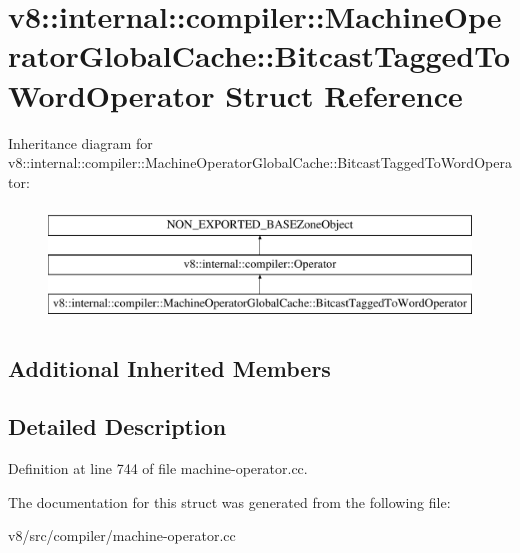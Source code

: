 \hypertarget{structv8_1_1internal_1_1compiler_1_1MachineOperatorGlobalCache_1_1BitcastTaggedToWordOperator}{}\section{v8\+:\+:internal\+:\+:compiler\+:\+:Machine\+Operator\+Global\+Cache\+:\+:Bitcast\+Tagged\+To\+Word\+Operator Struct Reference}
\label{structv8_1_1internal_1_1compiler_1_1MachineOperatorGlobalCache_1_1BitcastTaggedToWordOperator}
Inheritance diagram for v8\+:\+:internal\+:\+:compiler\+:\+:Machine\+Operator\+Global\+Cache\+:\+:Bitcast\+Tagged\+To\+Word\+Operator\+:\begin{figure}[H]
\begin{center}
\leavevmode
\includegraphics[height=3.000000cm]{structv8_1_1internal_1_1compiler_1_1MachineOperatorGlobalCache_1_1BitcastTaggedToWordOperator}
\end{center}
\end{figure}
\subsection*{Additional Inherited Members}


\subsection{Detailed Description}


Definition at line 744 of file machine-\/operator.\+cc.



The documentation for this struct was generated from the following file\+:\begin{DoxyCompactItemize}
\item 
v8/src/compiler/machine-\/operator.\+cc\end{DoxyCompactItemize}

